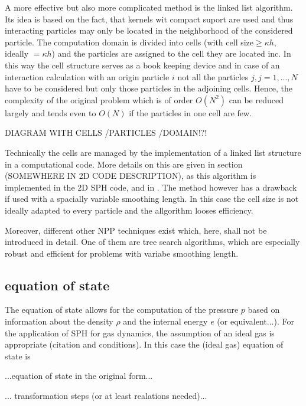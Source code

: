 \documentclass{report}
\begin{document}
A more effective but also more complicated method is the linked list
algorithm. Its idea is based on the fact, that kernels wit compact suport are
used and thus interacting particles may only be located in the neighborhood of
the considered particle. The computation domain is divided into cells (with
cell size$\ge \kappa h$, ideally $=\kappa h$) and the
particles are assigned to the cell they are located inc\cite{Monaghan1983}. In this way the cell
structure serves as a book keeping device and in case of an interaction
calculation with an origin particle $i$ not all the particles $j,j={1,...,N}$ have
to be considered but only those particles in the adjoining cells. Hence, the
complexity of the original problem which is of order $O(N^2)$ can be reduced
largely and tends even to $O(N)$ if the particles in one cell are few. 

DIAGRAM WITH CELLS /PARTICLES /DOMAIN!?!

Technically the cells are managed by the implementation of a linked list
structure in a computational code. More details on this are given in section
(SOMEWHERE IN 2D CODE DESCRIPTION), as this algorithm is implemented in the 2D
SPH code, and in \cite{Monaghan1985, Hockney1988}.
The method however has a drawback if used with a spacially variable smoothing
length. In this case the cell size is not ideally adapted to every particle
and the allgorithm looses efficiency.

Moreover, different other NPP techniques exist which, here, shall not be introduced in
detail. One of them are tree search algorithms\cite{Hernquist1989}, which are
especially robust and efficient for problems with variabe smoothing
length\cite{Liu2003}.





\subsection{equation of state}


The equation of state allows for the computation of the pressure $p$ based on
information about the density $\rho$ and the internal energy $e$ (or equivalent...). For the application of SPH for gas dynamics, the assumption of an ideal gas is appropriate (citation and conditions). In this case the (ideal gas) equation of state is

...equation of state in the original form...

...
transformation steps (or at least realations needed)...
\end{document}
